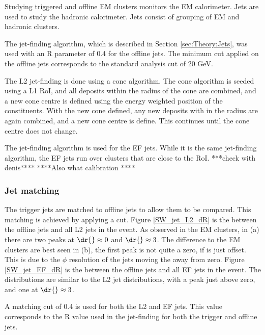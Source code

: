 
Studying triggered and offline EM clusters monitors the EM calorimeter. 
Jets are used to study the hadronic calorimeter.
Jets consist of grouping of EM and hadronic clusters.

The \antikt{} jet-finding algorithm, which is described in Section \ref{sec:Theory:Jets}, was used with an R parameter of 0.4 for the offline jets.
The minimum \pt{} cut applied on the offline jets corresponds to the standard analysis cut of 20 GeV.


The L2 jet-finding is done using a cone algorithm.
The cone algorithm is seeded using a L1 RoI, and all deposits within the radius of the cone are combined, and a new cone centre is defined using the energy weighted position of the constituents.
With the new cone defined, any new deposits with in the radius are again combined, and a new cone centre is define.
This continues until the cone centre does not change.

The \antikt{} jet-finding algorithm is used for the EF jets. 
While it is the same jet-finding algorithm, the EF jets run over clusters that are close to the RoI.
***check with denis**** 
****Also what calibration ****

\subsubsection{Jet matching}

The trigger jets are matched to offline jets to allow them to be compared.
This matching is achieved by applying a \dr{} cut.
Figure \ref{SW_jet_L2_dR} is the \dr{} between the offline jets and all L2 jets in the event.
As observed in the EM clusters, in (a) there are two peaks at $\dr{}\approx0$ and $\dr{}\approx3$.
The difference to the EM clusters are best seen in (b), the first peak is not quite a zero, if is just offset.
This is due to the $\phi$ resolution of the jets moving the \dphi{} away from zero. 
Figure \ref{SW_jet_EF_dR} is the \dr{} between the offline jets and all EF jets in the event.
The distributions are similar to the L2 jet \dr{} distributions, with a peak just above zero, and one at $\dr{}\approx3$. 

A \dr{} matching cut of 0.4 is used for both the L2 and EF jets.
This value corresponds to the R value used in the jet-finding for both the trigger and offline jets.

